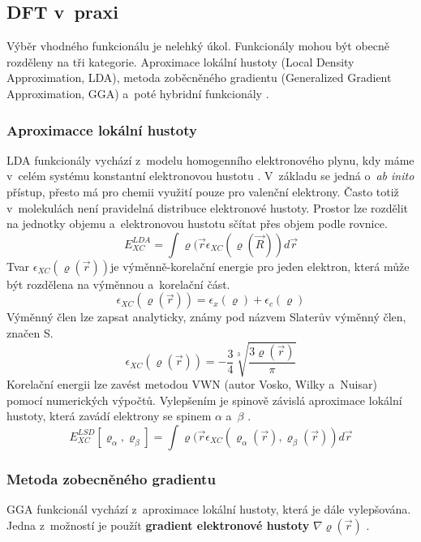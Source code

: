 \documentclass[
  printed, %
  table,   %
  lof,     %
  lot,     %
  oneside,
]{fithesis3}
\begin{document}
\subsection{DFT v~praxi}
Výběr vhodného funkcionálu je nelehký úkol. Funkcionály mohou být obecně rozděleny na tři kategorie. Aproximace lokální hustoty (Local Density Approximation, LDA), metoda zoběcněného gradientu (Generalized Gradient Approximation, GGA) a~poté hybridní funkcionály \cite{dftshrnutivysledky}.
\subsubsection{Aproximacce lokální hustoty}
LDA funkcionály vychází z~modelu homogenního elektronového plynu, kdy máme v~celém systému konstantní elektronovou hustotu \cite{dftshrnutivysledky}. V~základu se jedná o~\textit{ab inito} přístup, přesto má pro chemii využití pouze pro valenční elektrony. Často totiž v~molekulách není pravidelná distribuce elektronové hustoty. Prostor lze rozdělit na jednotky objemu a~elektronovou hustotu sčítat přes objem podle rovnice.
\begin{equation}
E_{XC}^{LDA} = \int \varrho (\vec{r} \epsilon_{XC} (\varrho (\vec{R})) d \vec{r}
\label{LDA_vyraz_pro_obecnou_energii}
\end{equation}
Tvar $\epsilon_{XC}(\varrho (\vec{r}))$je výměnně-korelační energie pro jeden elektron, která může být rozdělena na výměnnou a~korelační část. 
\begin{equation}
\epsilon_{XC}(\varrho (\vec{r})) = \epsilon_x (\varrho) + \epsilon_c (\varrho)
\label{LDA_tvar_vymene_korelacni_energie}
\end{equation}
Výměnný člen lze zapsat analyticky, známy pod názvem Slaterův výměnný člen, značen S.
\begin{equation}
\epsilon_{XC}(\varrho (\vec{r})) = - \frac{3}{4} \sqrt[3]{\frac{3 \varrho (\vec{r})}{\pi}}
\label{LDA_vymenny_clen}
\end{equation}
Korelační energii lze zavést metodou VWN (autor Vosko, Wilky a~Nuisar) pomocí numerických výpočtů. Vylepšením je spinově závislá aproximace lokální hustoty, která zavádí elektrony se spinem $\alpha$ a~$\beta$ \cite{koch2000chemist}.
\begin{equation}
E_{XC}^{LSD}[\varrho_{\alpha}, \varrho_{\beta}] = \int \varrho (\vec{r} \epsilon_{XC}( \varrho_{\alpha}(\vec{r}), \varrho_{\beta}(\vec{r})) d \vec{r}
\end{equation}

\subsubsection{Metoda zobecněného gradientu}
GGA funkcionál vychází z~aproximace lokální hustoty, která je dále vylepšována. Jedna z~možností je použít \textbf{gradient elektronové hustoty} $\nabla \varrho (\vec{r})$ \cite{koch2000chemist}.
\end{document}
